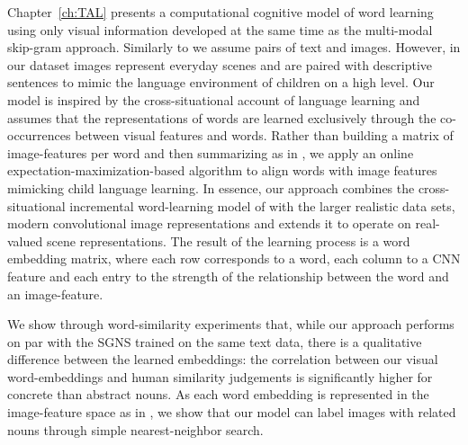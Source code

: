 Chapter~\ref{ch:TAL} presents a computational cognitive model of word learning using only
visual information developed at the same time as the multi-modal skip-gram approach.
Similarly to \cite{feng2010visual} we assume pairs of text and images. 
However, in our dataset images represent everyday scenes and are paired with descriptive
sentences to mimic the language environment of children on a high level.
Our model is inspired by the cross-situational account of language
learning  and assumes that the representations of words are learned exclusively through the co-occurrences
between visual features and words. Rather than building a
matrix of image-features per word and then summarizing as in \cite{kiela2014learning},
we apply an online expectation-maximization-based 
algorithm \citep{dempster1977maximum} to align words with image features mimicking 
child language learning.
In essence, our approach combines the cross-situational incremental word-learning model
of \cite{fazly.etal.10csj} with the larger realistic data sets, modern convolutional image representations
and extends it to operate on real-valued scene representations.
The result of the learning process is a word embedding matrix,
where each row corresponds to a word, each column 
to a CNN feature and each entry to the strength
of the relationship between the word and an image-feature.

We show through word-similarity experiments that, while our approach performs on
par with the SGNS trained on the same text data, there is a qualitative difference between
the learned embeddings: the correlation between our visual word-embeddings 
and human similarity judgements is significantly higher for concrete than abstract nouns. 
As each word embedding  is represented in the
image-feature space as in \cite{kiela2014learning}, we show that our model can label images 
with related nouns through simple nearest-neighbor search.

